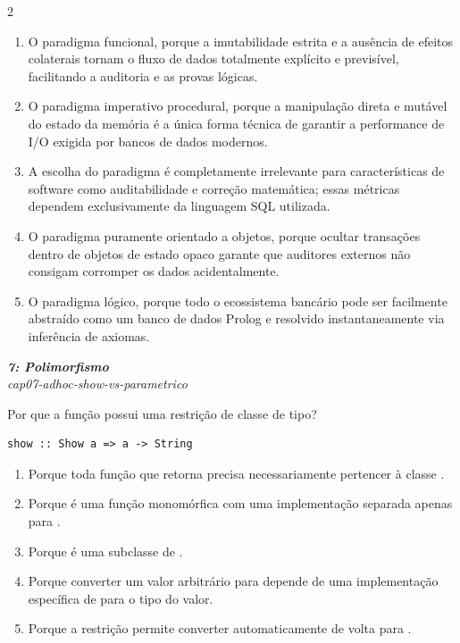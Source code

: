 \documentclass[a4paper,10pt,brazil]{article}
\begin{document}
\begin{multicols}{2}
\begin{enumerate}
  \item O paradigma funcional, porque a imutabilidade estrita e a ausência de efeitos colaterais tornam o fluxo de dados totalmente explícito e previsível, facilitando a auditoria e as provas lógicas.

  \item O paradigma imperativo procedural, porque a manipulação direta e mutável do estado da memória é a única forma técnica de garantir a performance de I/O exigida por bancos de dados modernos.

  \item A escolha do paradigma é completamente irrelevante para características de software como auditabilidade e correção matemática; essas métricas dependem exclusivamente da linguagem SQL utilizada.

  \item O paradigma puramente orientado a objetos, porque ocultar transações dentro de objetos de estado opaco garante que auditores externos não consigam corromper os dados acidentalmente.

  \item O paradigma lógico, porque todo o ecossistema bancário pode ser facilmente abstraído como um banco de dados Prolog e resolvido instantaneamente via inferência de axiomas.


\end{enumerate}

\begin{flushright}
  \footnotesize
  \textit{\textbf{7: Polimorfismo}}\\
  \textit{cap07-adhoc-show-vs-parametrico}\\

\end{flushright}
Por que a função  possui uma restrição de classe de tipo?

\begin{verbatim}
show :: Show a => a -> String
\end{verbatim}

\begin{enumerate}
  \item Porque toda função que retorna  precisa necessariamente pertencer à classe .
  \item Porque  é uma função monomórfica com uma implementação separada apenas para .
  \item Porque  é uma subclasse de .
  \item Porque converter um valor arbitrário para  depende de uma implementação específica de  para o tipo do valor.
  \item Porque a restrição  permite converter automaticamente  de volta para .


\end{enumerate}
\end{multicols}
\end{document}
